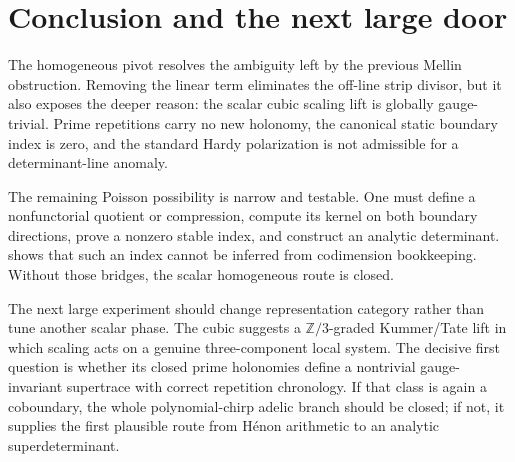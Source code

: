 \section{Conclusion and the next large door}

The homogeneous pivot resolves the ambiguity left by the previous Mellin
obstruction.  Removing the linear term eliminates the off-line strip
divisor, but it also exposes the deeper reason: the scalar cubic scaling
lift is globally gauge-trivial.  Prime repetitions carry no new holonomy,
the canonical static boundary index is zero, and the standard Hardy
polarization is not admissible for a determinant-line anomaly.

The remaining Poisson possibility is narrow and testable.  One must define
a nonfunctorial quotient or compression, compute its kernel on both boundary
directions, prove a nonzero stable index, and construct an analytic
determinant.   shows that such an index cannot be
inferred from codimension bookkeeping.  Without those bridges, the scalar
homogeneous route is closed.

The next large experiment should change representation category rather
than tune another scalar phase.  The cubic suggests a
\(\mathbb Z/3\)-graded Kummer/Tate lift in which scaling acts on a genuine
three-component local system.  The decisive first question is whether its
closed prime holonomies define a nontrivial gauge-invariant supertrace with
correct repetition chronology.  If that class is again a coboundary, the
whole polynomial-chirp adelic branch should be closed; if not, it supplies
the first plausible route from H\'enon arithmetic to an analytic
superdeterminant.
